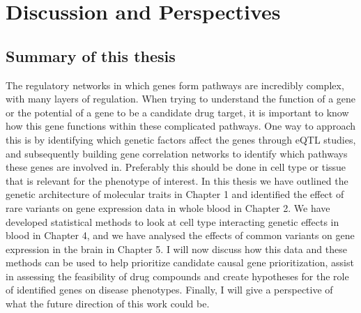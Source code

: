 \chapter{Discussion and Perspectives}
\label{chap:discussion}

{ \Large {} }

\newpage

\section{Summary of this thesis}
The regulatory networks in which genes form pathways are incredibly complex, with many layers of regulation. When trying to understand the function of a gene or the potential of a gene to be a candidate drug target, it is important to know how this gene functions within these complicated pathways. One way to approach this is by identifying which genetic factors affect the genes through eQTL studies, and subsequently building gene correlation networks to identify which pathways these genes are involved in. Preferably this should be done in cell type or tissue that is relevant for the phenotype of interest. In this thesis we have outlined the genetic architecture of molecular traits in Chapter 1\cite{claringbouldGeneticArchitectureMolecular2017} and identified the effect of rare variants on gene expression data in whole blood in Chapter 2\cite{kleinImbalancedExpressionPredicted2020}. We have developed statistical methods to look at cell type interacting genetic effects in blood in Chapter 4\cite{raulaguirre-gamboaDeconvolutionBulkBlood2020}, and we have analysed the effects of common variants on gene expression in the brain in Chapter 5. I will now discuss how this data and these methods can be used to help prioritize candidate causal gene prioritization, assist in assessing the feasibility of drug compounds and create hypotheses for the role of identified genes on disease phenotypes. Finally, I will give a perspective of what the future direction of this work could be. 

